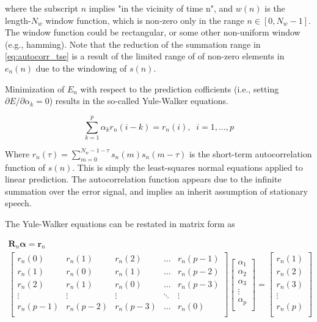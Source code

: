 \noindent
where the subscript $n$ implies "in the vicinity of time n", and $w(n)$ is the length-$N_w$ window function, which is non-zero only in the range $n \in [0, N_w-1]$. The window function could be rectangular, or some other non-uniform window (e.g., hamming). Note that the reduction of the summation range in \ref{eq:autocorr_tse} is a result of the limited range of of non-zero elements in $e_n(n)$ due to the windowing of $s(n)$.

Minimization of $E_n$ with respect to the prediction cofficients (i.e., setting $\partial E/\partial \alpha_k=0$) results in the so-called Yule-Walker equations. 

\begin{equation}
	\sum_{k=1}^{p} \alpha_k r_n(i-k) = r_n(i), \;\; i=1,\dots,p
\end{equation}

\noindent
Where $r_n(\tau) = \sum_{m=0}^{N_w-1-\tau}s_n(m)s_n(m-\tau)$ is the short-term autocorrelation function of $s(n)$. This is simply the least-squares normal equations applied to linear prediction. The autocorrelation function appears due to the infinite summation over the error signal, and implies an inherit assumption of stationary speech.

The Yule-Walker equations can be restated in matrix form as

\begin{eqnarray}
	\boldsymbol{R}_n \boldsymbol{\alpha} = \boldsymbol{r}_n \\
   	\begin{bmatrix} 
	   	r_n(0)    & r_n(1)      & r_n(2)     & \dots     & r_n(p-1)  \\
	   	r_n(1)     & r_n(0)      & r_n(1)     & \dots     & r_n(p-2)  \\
	   	r_n(2)     & r_n(1)      & r_n(0)     & \dots     & r_n(p-3)  \\
	   	\vdots     & \vdots      & \vdots     & \ddots  & \vdots  \\
	   	r_n(p-1)  & r_n(p-2)  & r_n(p-3) & \dots    & r_n(0)  \\
	\end{bmatrix} 
	\begin{bmatrix}
		\alpha_1 \\
		\alpha_2 \\
		\alpha_3 \\
		\vdots    \\
		\alpha_p \\
	\end{bmatrix}
	=
	\begin{bmatrix}
		r_n(1)  \\
		r_n(2) \\
		r_n(3) \\
		\vdots    \\
		r_n(p) \\
\end{bmatrix}
\end{eqnarray}

